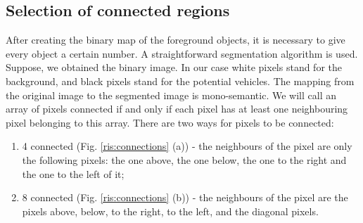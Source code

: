 \documentclass[12pt,a4paper,oneside,titlepage]{article}
\begin{document}
\subsection{Selection of connected regions}

After creating the binary map of the foreground objects, it is necessary to give every object a certain number.
A straightforward segmentation algorithm is used.
Suppose, we obtained the binary image.
In our case white pixels stand for the background, and black pixels stand for the potential vehicles.
The mapping from the original image to the segmented image is mono-semantic. 
We will call an array of pixels connected if and only if each pixel has at least one neighbouring pixel belonging to this array.
There are two ways for pixels to be connected:

\begin{enumerate}
  \item 4 connected (Fig. \ref{ris:connections} (a)) - the neighbours of the pixel are only the following pixels: the one above, the one below, the one to the right and the one to the left of it;
  \item 8 connected (Fig. \ref{ris:connections} (b)) - the neighbours of the pixel are the pixels above, below, to the right, to the left, and the diagonal pixels.
\end{enumerate}
\end{document}
